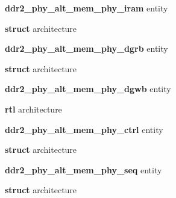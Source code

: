 \begin{DoxyCompactItemize}
{\bf ddr2\+\_\+phy\+\_\+alt\+\_\+mem\+\_\+phy\+\_\+iram} entity
\item 
{\bf struct} architecture
\item 
{\bf ddr2\+\_\+phy\+\_\+alt\+\_\+mem\+\_\+phy\+\_\+dgrb} entity
\item 
{\bf struct} architecture
\item 
{\bf ddr2\+\_\+phy\+\_\+alt\+\_\+mem\+\_\+phy\+\_\+dgwb} entity
\item 
{\bf rtl} architecture
\item 
{\bf ddr2\+\_\+phy\+\_\+alt\+\_\+mem\+\_\+phy\+\_\+ctrl} entity
\item 
{\bf struct} architecture
\item 
{\bf ddr2\+\_\+phy\+\_\+alt\+\_\+mem\+\_\+phy\+\_\+seq} entity
\item 
{\bf struct} architecture
\end{DoxyCompactItemize}

